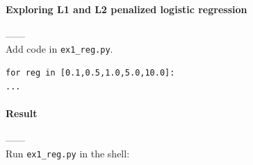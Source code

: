 \documentclass{article}
\begin{document}
\paragraph{Exploring L1 and L2 penalized logistic regression\\}
------\\
Add code in \verb|ex1_reg.py|.
\begin{tiny}
\begin{lstlisting}
for reg in [0.1,0.5,1.0,5.0,10.0]:
...
\end{lstlisting}
\end{tiny}
\paragraph{Result\\}
------\\
Run \verb|ex1_reg.py| in the shell:
\end{document}
